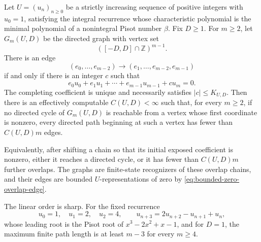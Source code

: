 \begin{theorem}
\label{thm:bounded-zero-linear-transient}
Let $U=(u_n)_{n\ge0}$ be a strictly increasing sequence of positive integers
with $u_0=1$, satisfying the integral recurrence whose characteristic
polynomial is the minimal polynomial of a nonintegral Pisot number $\beta$.
Fix $D\ge1$.  For $m\ge2$, let $G_m(U,D)$ be the directed graph with vertex
set
\[
([-D,D]\cap\mathbb Z)^{m-1}.
\]
There is an edge
\[
(e_0,\ldots,e_{m-2})\longrightarrow
(e_1,\ldots,e_{m-2},e_{m-1})
\]
if and only if there is an integer $c$ such that
\begin{equation}
e_0u_0+e_1u_1+\cdots+e_{m-1}u_{m-1}+cu_m=0.
\label{eq:bounded-zero-overlap-edge}
\end{equation}
The completing coefficient is unique and necessarily satisfies
$|c|\le K_{U,D}$.
Then there is an effectively computable $C(U,D)<\infty$ such that, for every
$m\ge2$, if no directed cycle of $G_m(U,D)$ is reachable from a vertex whose
first coordinate is nonzero, every directed path beginning at such a vertex
has fewer than $C(U,D)m$ edges.

Equivalently, after shifting a chain so that its initial exposed coefficient
is nonzero, either it reaches a directed cycle, or it has fewer than
$C(U,D)m$ further overlaps.  The graphs are finite-state recognizers of these
overlap chains, and their edges are bounded $U$-representations of zero by
\eqref{eq:bounded-zero-overlap-edge}.

The linear order is sharp.  For the fixed recurrence
\[
u_0=1,\quad u_1=2,\quad u_2=4,\qquad
u_{n+3}=2u_{n+2}-u_{n+1}+u_n,
\]
whose leading root is the Pisot root of $x^3-2x^2+x-1$, and for $D=1$, the
maximum finite path length is at least $m-3$ for every $m\ge4$.
\end{theorem}


